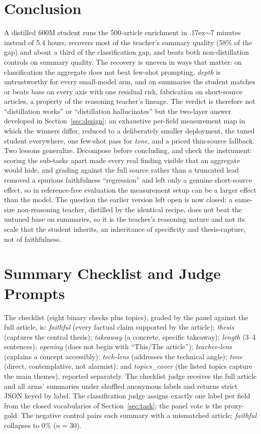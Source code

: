 \documentclass[10pt,journal]{IEEEtran}
\begin{document}
\section{Conclusion}\label{sec:conclusion}
A distilled 600M student runs the 500-article enrichment in {\raise.17ex\hbox{$\scriptstyle\sim$}}7 minutes instead of 5.4 hours, recovers most of the teacher's summary quality (58\% of the gap) and about a third of the classification gap, and beats both non-distillation controls on summary quality. The recovery is uneven in ways that matter: on classification the aggregate does not beat few-shot prompting, \emph{depth} is untrustworthy for every small-model arm, and on summaries the student matches or beats base on every axis with one residual risk, fabrication on short-source articles, a property of the reasoning teacher's lineage. The verdict is therefore not ``distillation works'' or ``distillation hallucinates'' but the two-layer answer developed in Section~\ref{sec:design}: an exhaustive per-field measurement map in which the winners differ, reduced to a deliberately smaller deployment, the tuned student everywhere, one few-shot pass for \emph{tone}, and a priced thin-source fallback. Two lessons generalize. Decompose before concluding, and check the instrument: scoring the sub-tasks apart made every real finding visible that an aggregate would hide, and grading against the full source rather than a truncated lead removed a spurious faithfulness ``regression'' and left only a genuine short-source effect, so in reference-free evaluation the measurement setup can be a larger effect than the model. The question the earlier version left open is now closed: a same-size non-reasoning teacher, distilled by the identical recipe, does not beat the untuned base on summaries, so it is the teacher's reasoning nature and not its scale that the student inherits, an inheritance of specificity and thesis-capture, not of faithfulness.

\appendices
\section{Summary Checklist and Judge Prompts}\label{app:checklist}
The checklist (eight binary checks plus topics), graded by the panel against the full article, is: \emph{faithful} (every factual claim supported by the article); \emph{thesis} (captures the central thesis); \emph{takeaway} (a concrete, specific takeaway); \emph{length} (3--4 sentences); \emph{opening} (does not begin with ``This/The article''); \emph{teacher-lens} (explains a concept accessibly); \emph{tech-lens} (addresses the technical angle); \emph{tone} (direct, contemplative, not alarmist); and \emph{topics\_cover} (the listed topics capture the main themes), reported separately. The checklist judge receives the full article and all arms' summaries under shuffled anonymous labels and returns strict JSON keyed by label. The classification judge assigns exactly one label per field from the closed vocabularies of Section~\ref{sec:task}; the panel vote is the proxy-gold. The negative control pairs each summary with a mismatched article; \emph{faithful} collapses to 0\% ($n=30$).
\end{document}
